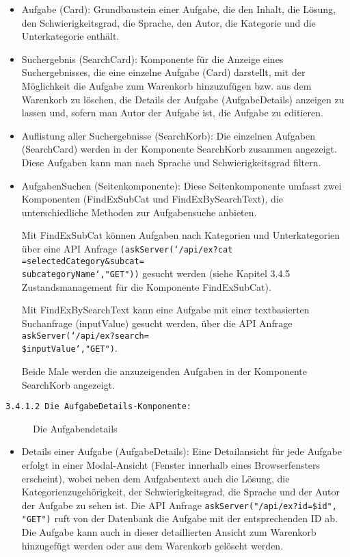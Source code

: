 \begin{itemize}

\item Aufgabe (Card):
Grundbaustein einer Aufgabe, die den Inhalt, die Lösung, den Schwierigkeitsgrad, die Sprache, den Autor, die Kategorie und die Unterkategorie enthält.

\item Suchergebnis (SearchCard):
Komponente für die Anzeige eines Suchergebnisses, die eine einzelne Aufgabe (Card) darstellt, mit der Möglichkeit die Aufgabe zum Warenkorb hinzuzufügen bzw. aus dem Warenkorb zu löschen, die Details der Aufgabe (AufgabeDetails) anzeigen zu lassen und, sofern man Autor der Aufgabe ist, die Aufgabe zu editieren.

\item Auflistung aller Suchergebnisse (SearchKorb):
Die einzelnen Aufgaben (SearchCard) werden in der Komponente SearchKorb zusammen angezeigt.
Diese Aufgaben kann man nach Sprache und Schwierigkeitsgrad filtern.

\item AufgabenSuchen (Seitenkomponente):
Diese Seitenkomponente umfasst zwei Komponenten (FindExSubCat und FindExBySearchText), die unterschiedliche Methoden zur Aufgabensuche anbieten. 

Mit FindExSubCat können Aufgaben nach Kategorien und Unterkategorien über eine API Anfrage \texttt{(askServer(`/api/ex?cat ={selectedCategory}\&subcat=\\{subcategoryName}`,"GET"))} gesucht werden (siehe Kapitel 3.4.5 Zustandsmanagement für die Komponente FindExSubCat).

Mit FindExBySearchText kann eine Aufgabe mit einer textbasierten Suchanfrage (inputValue) gesucht werden, über die API Anfrage \texttt{askServer(`/api/ex?search=\\\${inputValue}`,"GET")}.

Beide Male werden die anzuzeigenden Aufgaben in der Komponente SearchKorb angezeigt.


\end{itemize}

\texttt{3.4.1.2 Die AufgabeDetails-Komponente:}

\begin{figure}[H]
  \caption{Die Aufgabendetails \cite{fig:aufgabendetails}}
\end{figure}

\begin{itemize}
\item Details einer Aufgabe (AufgabeDetails):
Eine Detailansicht für jede Aufgabe erfolgt in einer Modal-Ansicht (Fenster innerhalb eines Browserfensters erscheint), wobei neben dem Aufgabentext auch die Lösung, die Kategorienzugehörigkeit, der Schwierigkeitsgrad, die Sprache und der Autor der Aufgabe zu sehen ist. 
Die API Anfrage \texttt{askServer("/api/ex?id=\${id}", "GET")} ruft von der Datenbank die Aufgabe mit der entsprechenden ID ab.
Die Aufgabe kann auch in dieser detaillierten Ansicht zum Warenkorb hinzugefügt werden oder aus dem Warenkorb gelöscht werden.



\end{itemize}

